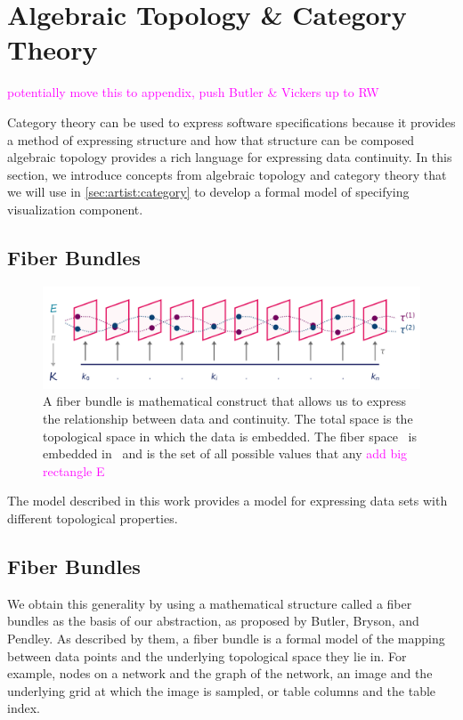 \documentclass[10pt,journal,compsoc]{IEEEtran}
\newcommand{\note}[1]{\textcolor{magenta}{#1}}
\theoremstyle{definition}
\theoremstyle{remark}
\begin{document}
\section{Algebraic Topology \& Category Theory}
\note{potentially move this to appendix, push Butler \& Vickers up to RW}

Category theory can be used to express software specifications because it provides a method of expressing structure and how that structure can be composed \cite{wielsManagementEvolvingSpecifications1998} algebraic topology provides a rich language for expressing data continuity. In this section, we introduce concepts from algebraic topology and category theory that we will use in \autoref{sec:artist:category} to develop a formal model of specifying visualization component.

\subsection{Fiber Bundles}
\label{sec:related-work:fiber-bundles}
\begin{figure}[h!]
  \includegraphics[width=\columnwidth]{fiberbundle.png}
  \caption{A fiber bundle is mathematical construct that allows us to express the relationship between data and continuity. The \textcolor{total}{total} space \dtotal is the topological space in which the data is embedded. The \textcolor{fiber}{fiber} space \dfiber\ is embedded in \dtotal\ and is the set of all possible values that any
  \note{add big rectangle E}}
  \label{fig:related-work:fiber-bundle}
\end{figure}

The model described in this work provides a model for expressing data sets with different topological properties. 

\subsection{Fiber Bundles}
We obtain this generality by using a mathematical structure called a fiber bundles as the basis of our abstraction, as proposed by Butler, Bryson, and Pendley\cite{butlerVisualizationModelBased1989,
butlerVectorBundleClassesForm1992}. As described by them, a fiber bundle is a formal model of the mapping between data points and the underlying topological space they lie in. For example, nodes on a network and the graph of the network, an image and the underlying grid at which the image is sampled, or table columns and the table index.
\end{document}
